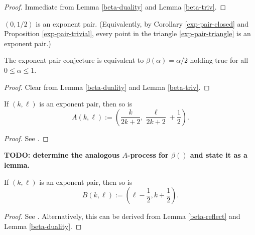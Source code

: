 \begin{proof} Immediate from Lemma \ref{beta-duality} and Lemma \ref{beta-triv}.
\end{proof}

\begin{conjecture}\label{exp-pair-conj}  $(0,1/2)$ is an exponent pair.  (Equivalently, by Corollary \ref{exp-pair-closed} and Proposition \ref{exp-pair-trivial}, every point in the triangle \eqref{exp-pair-triangle} is an exponent pair.)
\end{conjecture}



\begin{lemma}\label{exp-pair-conj-beta}  The exponent pair conjecture is equivalent to $\beta(\alpha)=\alpha/2$ holding true for all $0 \leq \alpha \leq 1$.
\end{lemma}

\begin{proof} Clear from Lemma \ref{beta-duality} and Lemma \ref{beta-triv}.
\end{proof}

\begin{proposition}\label{vdc-a}  If $(k,\ell)$ is an exponent pair, then so is
    $$A(k,\ell) := \left(\frac{k}{2k+2}, \frac{\ell}{2k+2} + \frac{1}{2}\right).$$
\end{proposition}

\literature
{}

\begin{proof} See \cite[Lemma 2.8]{ivic}.
\end{proof}

{\bf TODO: determine the analogous $A$-process for $\beta()$ and state it as a lemma.}

\begin{proposition}\label{vdc-b}  If $(k,\ell)$ is an exponent pair, then so is
    $$B(k,\ell) := \left(\ell-\frac{1}{2}, k+\frac{1}{2}\right).$$
\end{proposition}

\literature
{}

\begin{proof}  See \cite[Lemma 2.9]{ivic}.  Alternatively, this can be derived from Lemma \ref{beta-reflect} and Lemma \ref{beta-duality}.
\end{proof}


